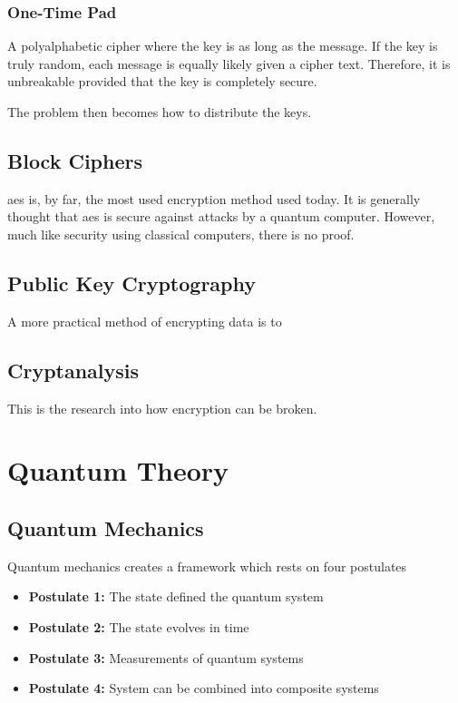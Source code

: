 \subsubsection*{One-Time Pad}

A polyalphabetic cipher where the key is as long as the message. If the key is truly random, each message is equally likely given a cipher text. Therefore, it is unbreakable provided that the key is completely secure.

The problem then becomes how to distribute the keys.

\subsection{Block Ciphers}

\Ac{aes} is, by far, the most used encryption method used today. It is generally thought that \ac{aes} is secure against attacks by a quantum computer. However, much like security using classical computers, there is no proof.

\subsection{Public Key Cryptography}

A more practical method of encrypting data is to 

\subsection{Cryptanalysis}
\label{sec1:cryptanalysis}

This is the research into how encryption can be broken.

\section{Quantum Theory}

\subsection{Quantum Mechanics}

Quantum mechanics creates a framework which rests on four postulates

\begin{itemize}
	\item[] \textbf{Postulate 1:} The state defined the quantum system
	\item[] \textbf{Postulate 2:} The state evolves in time
	\item[] \textbf{Postulate 3:} Measurements of quantum systems
	\item[] \textbf{Postulate 4:} System can be combined into composite systems
\end{itemize}

